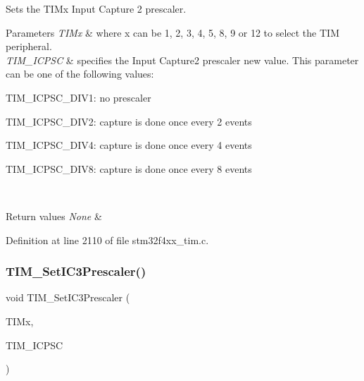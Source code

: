 Sets the T\+I\+Mx Input Capture 2 prescaler. 


\begin{DoxyParams}{Parameters}
{\em T\+I\+Mx} & where x can be 1, 2, 3, 4, 5, 8, 9 or 12 to select the T\+IM peripheral. \\
\hline
{\em T\+I\+M\+\_\+\+I\+C\+P\+SC} & specifies the Input Capture2 prescaler new value. This parameter can be one of the following values\+: \begin{DoxyItemize}
\item T\+I\+M\+\_\+\+I\+C\+P\+S\+C\+\_\+\+D\+I\+V1\+: no prescaler \item T\+I\+M\+\_\+\+I\+C\+P\+S\+C\+\_\+\+D\+I\+V2\+: capture is done once every 2 events \item T\+I\+M\+\_\+\+I\+C\+P\+S\+C\+\_\+\+D\+I\+V4\+: capture is done once every 4 events \item T\+I\+M\+\_\+\+I\+C\+P\+S\+C\+\_\+\+D\+I\+V8\+: capture is done once every 8 events \end{DoxyItemize}
\\
\hline
\end{DoxyParams}

\begin{DoxyRetVals}{Return values}
{\em None} & \\
\hline
\end{DoxyRetVals}


Definition at line 2110 of file stm32f4xx\+\_\+tim.\+c.

\mbox{\label{group___t_i_m_ga76f906383b8132ebe00dffadb70cf7f9}} 
\subsubsection{\texorpdfstring{T\+I\+M\+\_\+\+Set\+I\+C3\+Prescaler()}{TIM\_SetIC3Prescaler()}}
{\footnotesize\ttfamily void T\+I\+M\+\_\+\+Set\+I\+C3\+Prescaler (\begin{DoxyParamCaption}\item[{\hyperlink{struct_t_i_m___type_def}{T\+I\+M\+\_\+\+Type\+Def} $\ast$}]{T\+I\+Mx,  }\item[{uint16\+\_\+t}]{T\+I\+M\+\_\+\+I\+C\+P\+SC }\end{DoxyParamCaption})}



